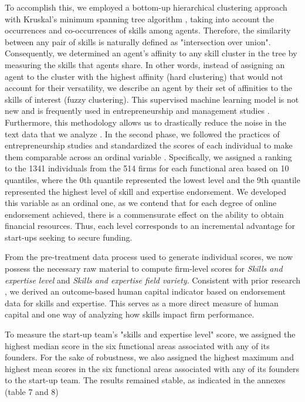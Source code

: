 \documentclass[12pt]{article}
\begin{document}
To accomplish this, we employed a bottom-up hierarchical clustering approach with Kruskal's minimum spanning tree algorithm \citep{kruskal1956shortest}, taking into account the occurrences and co-occurrences of skills among agents. Therefore, the similarity between any pair of skills is naturally defined as "intersection over union". Consequently, we determined an agent's affinity to any skill cluster in the tree by measuring the skills that agents share. In other words, instead of assigning an agent to the cluster with the highest affinity (hard clustering) that would not account for their versatility, we describe an agent by their set of affinities to the skills of interest (fuzzy clustering). This supervised machine learning model is not new and is frequently used in entrepreneurship and management studies \citep{kaushal2021artificial}. Furthermore, this methodology allows us to drastically reduce the noise in the text data that we analyze \citep{wu2018analysis}. In the second phase, we followed the practices of entrepreneurship studies and standardized the scores of each individual to make them comparable across an ordinal variable \citep{harrison2007s}. Specifically, we assigned a ranking to the 1341 individuals from the 514 firms for each functional area based on 10 quantiles, where the 0th quantile represented the lowest level and the 9th quantile represented the highest level of skill and expertise endorsement. We developed this variable as an ordinal one, as we contend that for each degree of online endorsement achieved, there is a commensurate effect on the ability to obtain financial resources. Thus, each level corresponds to an incremental advantage for start-ups seeking to secure funding.

From the pre-treatment data process used to generate individual scores, we now possess the necessary raw material to compute firm-level scores for \textit{Skills and expertise level} and \textit{Skills and expertise field variety}. Consistent with prior research \citep{unger2011human, marvel2016human}, we derived an outcome-based human capital indicator based on endorsement data for skills and expertise. This serves as a more direct measure of human capital and one way of analyzing how skills impact firm performance.

To measure the start-up team's "skills and expertise level" score, we assigned the highest median score in the six functional areas associated with any of its founders. For the sake of robustness, we also assigned the highest maximum and highest mean scores in the six functional areas associated with any of its founders to the start-up team. The results remained stable, as indicated in the annexes (table 7 and 8)
\end{document}
